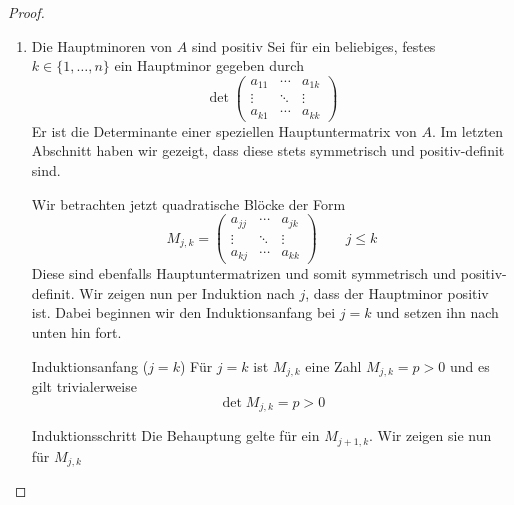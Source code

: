 \documentclass{mycourse}
\begin{document}
\begin{st}
\begin{proof}
\begin{enumerate}
\begin{seg}{Jede Hauptuntermatrix $\tilde A$ von $A$ ist symmetrisch und positiv definit}
				Die Symmetrie ($a_{i_l,i_j} = a_{i_j,i_l}$) folgt aus der Symmetrie von $A$
				
				Jeder Vektor $\tilde x\in \R^k \neq 0$ kann folgendermaßen zu einem Vektor
				$x \in \R^n \neq 0$ erweitert werden:
				\[
					x_\my = \begin{cases} \tilde x_j & \text{falls $\my = i_j$}\\
				0 & \text{sonst}\end{cases}
				\]
				Dann ist
				\[
					\tilde x^T \tilde A \tilde x = x^T Ax > 0
				\]
				Also ist $\tilde A$ positiv-definit.
				\end{seg}
			\item \begin{seg}{Die Hauptminoren von $A$ sind positiv}
					Sei für ein beliebiges, festes $k\in \{1,\dotsc,n\}$ ein Hauptminor gegeben durch
				\[
					\det \begin{pmatrix}a_{11} & \cdots & a_{1k} \\ \vdots & \ddots & \vdots \\ a_{k1} & \cdots & a_{kk}\end{pmatrix}
				\]
				Er ist die Determinante einer speziellen Hauptuntermatrix von $A$.
				Im letzten Abschnitt haben wir gezeigt, dass diese stets symmetrisch und positiv-definit sind.

				Wir betrachten jetzt quadratische Blöcke der Form
				\[
					M_{j,k} = \begin{pmatrix}
						a_{jj} & \cdots & a_{jk}\\
						\vdots & \ddots & \vdots\\
						a_{kj} & \cdots & a_{kk}
					\end{pmatrix} \qquad j \le k
				\]
				Diese sind ebenfalls Hauptuntermatrizen und somit symmetrisch und positiv-definit.
				Wir zeigen nun per Induktion nach $j$, dass der Hauptminor positiv ist.
				Dabei beginnen wir den Induktionsanfang bei $j=k$ und setzen ihn nach unten hin fort.

				\begin{seg}{Induktionsanfang ($j=k$)}
					Für $j=k$ ist $M_{j,k}$ eine Zahl $M_{j,k} = p>0$ und es gilt trivialerweise
					\[
						\det M_{j,k} = p > 0
					\]
				\end{seg}
				\begin{seg}{Induktionsschritt}
					Die Behauptung gelte für ein $M_{j+1,k}$.
					Wir zeigen sie nun für $M_{j,k}$					
					

\end{seg}
\end{seg}
\end{enumerate}
\end{proof}
\end{st}
\end{document}
